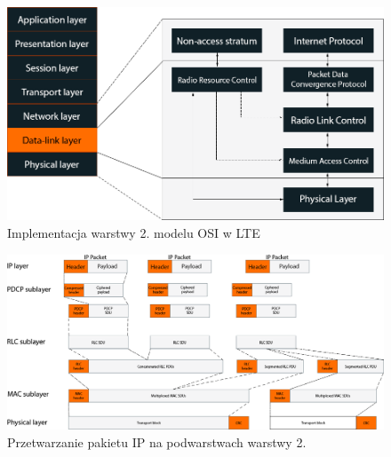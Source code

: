 \begin{figure}
	\centerline{\includegraphics[width=1.0\textwidth]{images/osi_to_lte.png}}
	\caption{Implementacja warstwy 2. modelu OSI w LTE}
	\label{fig:osi_to_lte}
\end{figure}

\begin{figure}
	\centerline{\includegraphics[width=1.0\textwidth]{images/pdu_overview.png}}
	\caption{Przetwarzanie pakietu IP na podwarstwach warstwy 2.}
	\label{fig:ip_through_layers}
\end{figure}
